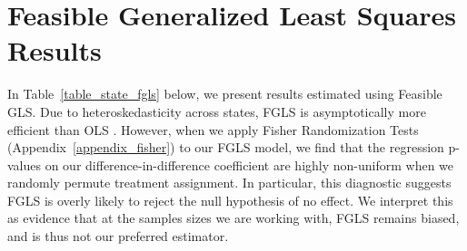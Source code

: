 \documentclass[12pt]{article}
\begin{document}
\section{Feasible Generalized Least Squares Results}\label{appendix_fgls}
\setcounter{table}{0}
\setcounter{figure}{0}
\renewcommand{\thetable}{K\arabic{table}}
\renewcommand{\thefigure}{K\arabic{figure}}
\normalsize

In Table~\ref{table_state_fgls} below, we present results estimated using Feasible GLS. Due to heteroskedasticity across states, FGLS is asymptotically more efficient than OLS \citep{Cameron:2005vy}. However, when we apply Fisher Randomization Tests (Appendix~\ref{appendix_fisher}) to our FGLS model, we find that the regression p-values on our difference-in-difference coefficient are highly non-uniform when we randomly permute treatment assignment. In particular, this diagnostic suggests FGLS is overly likely to reject the null hypothesis of no effect. We interpret this as evidence that at the samples sizes we are working with, FGLS remains biased, and is thus not our preferred estimator.
\end{document}
